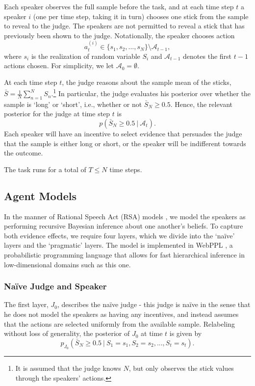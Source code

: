 \documentclass[10pt,letterpaper]{article}
\begin{document}
Each speaker observes the full sample before the task, and at each time step $t$ a speaker
$i$ (one per time step, taking it in turn) chooses one stick from the sample to reveal
to the judge. The speakers are not permitted to reveal a stick that has previously been shown to 
the judge. Notationally, the speaker chooses action 
\begin{equation}
a_t^{(i)} \in \{s_1, s_2, ..., s_N\} \setminus \mathcal{A}_{t-1},
\end{equation}
where $s_i$ is the realization of random variable $S_i$ and $\mathcal{A}_{t-1}$ denotes the first
$t-1$ actions chosen. For simplicity, we let $\mathcal{A}_0 = \emptyset$.

At each time step $t$, the judge reasons about the sample mean of the sticks, 
$\bar{S} = \frac{1}{N} \sum_{n=1}^N S_n$.\footnote{It is assumed that the judge knows $N$, but only observes the stick values through the speakers' actions.}
In particular, the judge evaluates his posterior over whether the sample is `long' or `short', i.e., whether or not
$\bar{S	}_N \ge 0.5$. Hence, the relevant posterior for the judge at time step $t$ is
\begin{equation}
p( \bar{S}_N \ge 0.5 \ | \ \mathcal{A}_t ).
\end{equation}
Each speaker will have an incentive to select evidence that persuades the judge that the sample is
either long or short, or the speaker will be indifferent towards the outcome.

The task runs for a total of $T\le N$ time steps.

\subsection{Agent Models}
In the manner of Rational Speech Act (RSA) models \cite{goodman_pragmatic_2016}, we model the speakers as performing
recursive Bayesian inference about one another's beliefs. To capture both evidence effects,
we require four layers, which we divide into the `na\"ive' layers and the `pragmatic' layers.
The model is implemented in WebPPL \cite{dippl}, a probabilistic programming language that allows for
fast hierarchical inference in low-dimensional domains such as this one.

\subsubsection{Na\"ive Judge and Speaker}
The first layer, $J_0$, describes the na\"ive judge - this judge is na\"ive in the sense that he
does not model the speakers as having any incentives, and instead assumes that the actions are selected
uniformly from the available sample. Relabeling without loss of generality, the posterior of $J_0$ at time $t$ is given by
\begin{equation}
p_{J_0}( \bar{S}_N \ge 0.5 \ | \ S_1=s_1, S_2=s_2, ..., S_t=s_t).
\end{equation}
\end{document}
